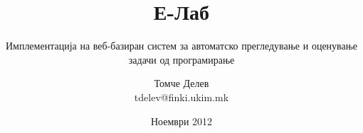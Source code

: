 

\author[T. Delev]{Томче Делев\\tdelev@finki.ukim.mk\\}
\title[E-Lab]{Е-Лаб}
\subtitle{Имплементација на веб-базиран систем за автоматско\newline
прегледување и оценување задачи од програмирање}
\date{Ноември 2012}




\frame[t,plain]{\titlepage}





